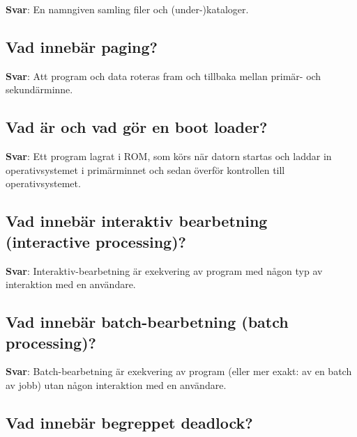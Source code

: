 \documentclass[a4paper,11pt,oneside]{article}
\begin{document}
\begin{sloppypar}
\label{q:123:sa:sv:True}

\textbf{Svar}: En namngiven samling filer och (under-)kataloger.



\subsection{Vad inneb\"ar paging?}

\label{q:124:sa:sv:True}

\textbf{Svar}: Att program och data roteras fram och tillbaka mellan prim\"ar- och sekund\"arminne.



\subsection{Vad \"ar och vad g\"or en boot loader?}

\label{q:125:sa:sv:True}

\textbf{Svar}: Ett program lagrat i ROM, som k\"ors n\"ar datorn startas och laddar in operativsystemet i prim\"arminnet och sedan \"overf\"or kontrollen till operativsystemet.



\subsection{Vad inneb\"ar interaktiv bearbetning (interactive processing)?}

\label{q:126:sa:sv:True}

\textbf{Svar}: Interaktiv-bearbetning \"ar exekvering av program med n\r{a}gon typ av interaktion med en anv\"andare.



\subsection{Vad inneb\"ar batch-bearbetning (batch processing)?}

\label{q:127:sa:sv:True}

\textbf{Svar}: Batch-bearbetning \"ar exekvering av program (eller mer exakt: av en batch av jobb) utan n\r{a}gon interaktion med en anv\"andare.



\subsection{Vad inneb\"ar begreppet deadlock?}


\end{sloppypar}
\end{document}
